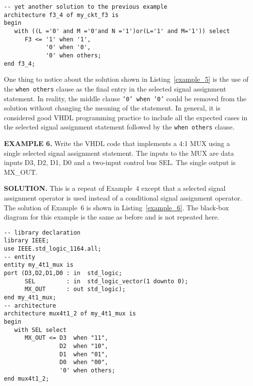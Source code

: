 \noindent
\begin{minipage}{0.99\linewidth}
\begin{lstlisting}[label=example_5, caption=Solution of Example~5.]
-- yet another solution to the previous example
architecture f3_4 of my_ckt_f3 is
begin
   with ((L ='0' and M ='0'and N ='1')or(L='1' and M='1')) select
      F3 <= '1' when '1',
            '0' when '0',
            '0' when others;
end f3_4;
\end{lstlisting}
\end{minipage}

One thing to notice about the solution shown in Listing~\ref{example_5} is the use of the \texttt{when others} clause as the final entry in the selected signal assignment statement. In reality, the middle clause \texttt{'0' when '0'} could be removed from the solution without changing the meaning of the statement. In general, it is considered good VHDL programming practice to include all the expected cases in the selected signal assignment statement followed by the \texttt{when others} clause.
\begin{leftbar}
\noindent
\textbf{EXAMPLE 6.}
Write the VHDL code that implements a 4:1 MUX using a single selected signal assignment statement. The inputs to the MUX are data inputs D3, D2, D1, D0 and a two-input control bus SEL. The single output is MX\_OUT.
\end{leftbar}
\noindent
\textbf{SOLUTION.} This is a repeat of Example~4 except that a selected signal assignment operator is used instead of a conditional signal assignment operator. The solution of Example~6 is shown in Listing~\ref{example_6}. The black-box diagram for this example is the same as before and is not repeated here.

\begin{lstlisting}[float, label=example_6, caption=Solution of Example~6.]
-- library declaration
library IEEE;
use IEEE.std_logic_1164.all;
-- entity
entity my_4t1_mux is
port (D3,D2,D1,D0 : in  std_logic;
      SEL         : in  std_logic_vector(1 downto 0);
      MX_OUT      : out std_logic);
end my_4t1_mux;
-- architecture
architecture mux4t1_2 of my_4t1_mux is
begin
   with SEL select
      MX_OUT <= D3  when "11",
                D2  when "10",
                D1  when "01",
                D0  when "00",
                '0' when others;
end mux4t1_2;
\end{lstlisting}

